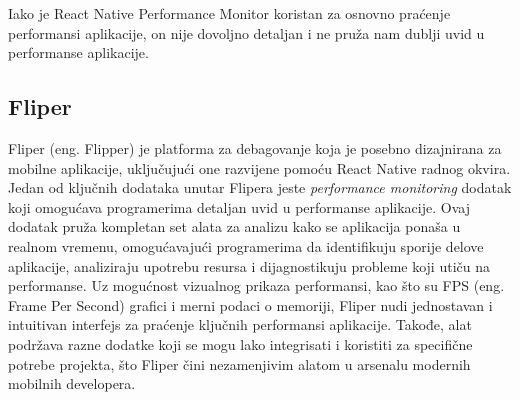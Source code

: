 \documentclass[12pt,oneside]{memoir}
\begin{document}
Iako je React Native Performance Monitor koristan za osnovno praćenje performansi aplikacije, on nije dovoljno detaljan i ne pruža nam dublji uvid u performanse aplikacije.

\subsection{Fliper}

Fliper (eng. Flipper) je platforma za debagovanje koja je posebno dizajnirana za mobilne aplikacije, uključujući one razvijene pomoću React Native radnog okvira. Jedan od ključnih dodataka unutar Flipera jeste \textit{performance monitoring} dodatak koji omogućava programerima detaljan uvid u performanse aplikacije. Ovaj dodatak pruža kompletan set alata za analizu kako se aplikacija ponaša u realnom vremenu, omogućavajući programerima da identifikuju sporije delove aplikacije, analiziraju upotrebu resursa i dijagnostikuju probleme koji utiču na performanse. Uz mogućnost vizualnog prikaza performansi, kao što su FPS (eng. Frame Per Second) grafici i merni podaci o memoriji, Fliper nudi jednostavan i intuitivan interfejs za praćenje ključnih performansi aplikacije. Takođe, alat podržava razne dodatke koji se mogu lako integrisati i koristiti za specifične potrebe projekta, što Fliper čini nezamenjivim alatom u arsenalu modernih mobilnih developera.

\begin{figure}[!h]
    \centering
    \qquad
\end{figure}
\end{document}
